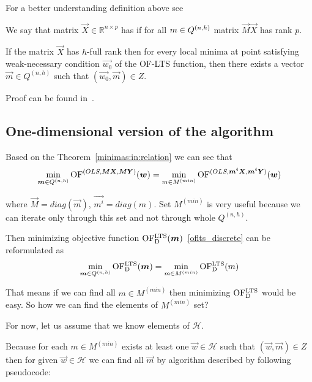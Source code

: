 For a better understanding definition above see 


We say that matrix $\vec{X} \in \mathbb{R}^{n \times p}$ has  if for all $m \in Q^{(n,h)}$ matrix $\vec{M}\vec{X}$ has rank $p$.

\begin{theorem} \label{minimas:in:relation}
    If the matrix $\vec{X}$ has $h$-full rank then for every local minima at point satisfying weak-necessary condition $\vec{w_{0}}$ of the OF-LTS function, then there exists a vector $\vec{m} \in Q^{(n,h)}$ such that $(\vec{w_{0}}, \vec{m}) \in Z$.
\end{theorem}

Proof can be found in~\cite[Theorem~7]{klouda2015exact}. 

\subsection{ One-dimensional version of the algorithm}

Based on the Theorem~\ref{minimas:in:relation} we can see that
\begin{equation}
    \operatorname*{min}_{\boldsymbol{m} \in Q^{(n,h)}} \operatorname{OF}^{(OLS, \boldsymbol{M}\boldsymbol{X}, \boldsymbol{M}\boldsymbol{Y})} (\boldsymbol{w}) =
    \operatorname*{min}_{m \in M^{(min)}} \operatorname{OF}^{(OLS, \boldsymbol{m^i}\boldsymbol{X}, \boldsymbol{m^i}\boldsymbol{Y})} (\boldsymbol{w})
\end{equation}

where $\vec{M} = diag(\vec{m})$, $\vec{m^i} = diag(m)$. Set $M^{(min)}$ is very useful because we can iterate only through this set and not through whole $Q^{(n,h)}$.

Then minimizing objective function $\operatorname{OF^{LTS}_D}(\boldsymbol{m})$~\eqref{oflts_discrete} can be reformulated as 
\begin{equation} \label{mminqnh}
    \operatorname*{min}_{\boldsymbol{m} \in Q^{(n,h)}}  \operatorname{OF^{LTS}_D}(\boldsymbol{m}) = \operatorname*{min}_{m \in M^{(min)}} \operatorname{OF^{LTS}_D}(m)
\end{equation}


That means if we can find all $m \in M^{(min)}$ then minimizing $\operatorname{OF^{LTS}_D}$ would be easy.
So how we can find the elements of $M^{(min)}$ set? 

For now, let us assume that we know elements of $\mathcal{H}$.

Because for each $m \in M^{(min)}$ exists at least one $\vec{w} \in \mathcal{H}$ such that $(\vec{w}, \vec{m}) \in Z$ then for given $\vec{w} \in \mathcal{H}$ we can find all $\vec{m}$ by algorithm described by following pseudocode:

